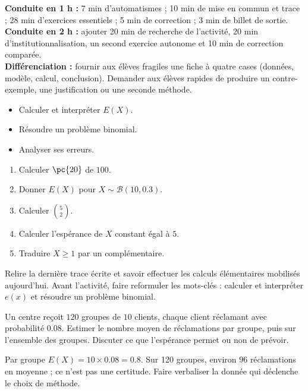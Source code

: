 \ifmxteacher
\begin{method}
\textbf{Conduite en 1 h :} 7 min d'automatismes ; 10 min de mise en commun et trace ; 28 min d'exercices essentiels ; 5 min de correction ; 3 min de billet de sortie.\\
\textbf{Conduite en 2 h :} ajouter 20 min de recherche de l'activité, 20 min d'institutionnalisation, un second exercice autonome et 10 min de correction comparée.\\
\textbf{Différenciation :} fournir aux élèves fragiles une fiche à quatre cases (données, modèle, calcul, conclusion). Demander aux élèves rapides de produire un contre-exemple, une justification ou une seconde méthode.
\end{method}
\fi
{}
\begin{objectives}\begin{itemize}\item Calculer et interpréter $E(X)$.\item Résoudre un problème binomial.\item Analyser ses erreurs.\end{itemize}\end{objectives}
\begin{fluency}\begin{enumerate}\item Calculer $\pc{20}$ de $100$. \item Donner $E(X)$ pour $X\sim\mathcal B(10,\num{0,3})$. \item Calculer $\binom52$. \item Calculer l'espérance de $X$ constant égal à $5$. \item Traduire $X\geq1$ par un complémentaire. \end{enumerate}\end{fluency}
\begin{prerequisites}Relire la dernière trace écrite et savoir effectuer les calculs élémentaires mobilisés aujourd'hui. Avant l'activité, faire reformuler les mots-clés : calculer et interpréter $e(x)$ et résoudre un problème binomial.\end{prerequisites}

\begin{activity}
Un centre reçoit $120$ groupes de $10$ clients, chaque client réclamant avec probabilité $\num{0,08}$. Estimer le nombre moyen de réclamations par groupe, puis sur l'ensemble des groupes. Discuter ce que l'espérance permet ou non de prévoir.

\end{activity}
\begin{solution}Par groupe $E(X)=10\times\num{0,08}=\num{0,8}$. Sur 120 groupes, environ $96$ réclamations en moyenne ; ce n'est pas une certitude. Faire verbaliser la donnée qui déclenche le choix de méthode.\end{solution}

